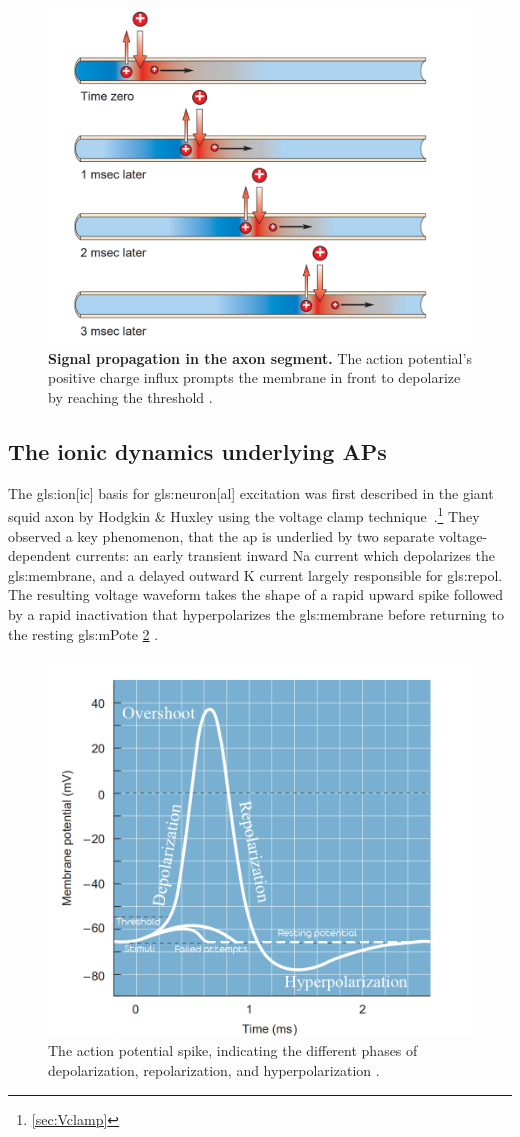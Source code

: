 \documentclass[class={myRUCProject}, crop=false]{standalone}
\begin{document}
\begin{figure}[H]
  \centering
  \includegraphics[width=0.4\linewidth]{Pictures/Svet/Screenshot (903).png}
  \caption{\textbf{Signal propagation in the axon segment.} The action potential's positive charge influx prompts the membrane in front to depolarize by reaching the threshold \cite{wood1996neuroscience}.}\label{fig:cond}
\end{figure}

\subsection{The ionic dynamics underlying APs}

The \gls{gls:ion}[ic] basis for \gls{gls:neuron}[al] excitation was first described in the giant squid axon by Hodgkin \& Huxley  using the voltage clamp technique~\cite{HodHux1952}.\footnote{\cref{sec:Vclamp}}{} They observed a key phenomenon, that the \gls{ap} is underlied by two separate voltage-dependent currents: an early transient inward \gls{Na} current which depolarizes the \gls{gls:membrane}, and a delayed outward \gls{K} current largely responsible for \gls{gls:repol}. 
The resulting voltage waveform takes the shape of a rapid upward spike followed by a rapid inactivation that hyperpolarizes the \gls{gls:membrane} before returning to the resting \gls{gls:mPote} \cref{fig:AP} \cite{Hammond2015ch4}.

\begin{figure}[H]
  \centering
  \includegraphics[width=0.6\linewidth]{Pictures/Svet/Untitled-1.png}
  \caption{The action potential spike, indicating the different phases of depolarization, repolarization, and hyperpolarization \cite{wood1996neuroscience}.}\label{fig:AP}
\end{figure}
\end{document}
